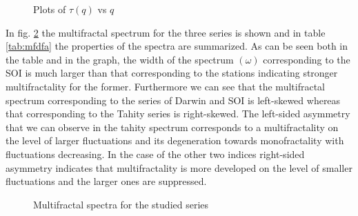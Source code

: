 \documentclass[onecolumn, preprint,aps,amsmath, amssymb, superscriptaddress]{revtex4}
\begin{document}
\begin{figure}
\caption{Plots of $\tau(q)$ vs $q$}
\label{fig:tau}
\end{figure}

In fig. \ref{fig:spectrum} the multifractal spectrum for the three series is shown and in table \ref{tab:mfdfa} the properties of the spectra are summarized. As can be seen both in the table and in the graph, the width of the spectrum $(\omega)$ corresponding to the SOI is much larger than that corresponding to the stations indicating stronger multifractality for the former. Furthermore we can see that the multifractal spectrum corresponding to the series of Darwin and SOI is left-skewed whereas that corresponding to the Tahity series is right-skewed. The left-sided asymmetry that we can observe in the tahity spectrum corresponds to a  multifractality on the level of larger fluctuations and its degeneration towards monofractality with fluctuations decreasing. In the case of the other two indices right-sided asymmetry indicates that multifractality is more developed on the level of smaller fluctuations and the larger ones are suppressed.


\begin{figure}
\caption{Multifractal spectra for the studied series}
\label{fig:spectrum}
\end{figure}
\end{document}
